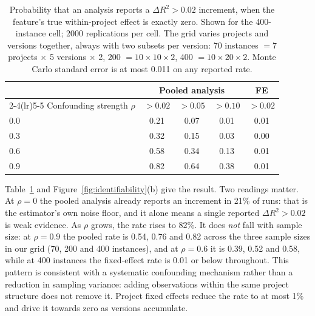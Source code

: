 \documentclass[preprint,12pt]{elsarticle}
\begin{document}
\begin{table}[t]
\centering
\caption{Probability that an analysis reports a $\Delta R^2 > 0.02$
increment, when the feature's true within-project effect is exactly zero.
Shown for the 400-instance cell; \num{2000} replications per cell. The grid
varies projects and versions together, always with two subsets per version:
70 instances $= 7$ projects $\times$ 5 versions $\times$ 2, 200 $= 10 \times
10 \times 2$, 400 $= 10 \times 20 \times 2$. Monte Carlo standard error is
at most \num{0.011} on any reported rate.}
\label{tab:sim}
\begin{tabular}{lcccc}
\toprule
& \multicolumn{3}{c}{Pooled analysis} & FE \\
\cmidrule(lr){2-4}\cmidrule(lr){5-5}
Confounding strength $\rho$ & $>0.02$ & $>0.05$ & $>0.10$ & $>0.02$ \\
\midrule
0.0 & 0.21 & 0.07 & 0.01 & 0.01 \\
0.3 & 0.32 & 0.15 & 0.03 & 0.00 \\
0.6 & 0.58 & 0.34 & 0.13 & 0.01 \\
0.9 & 0.82 & 0.64 & 0.38 & 0.01 \\
\bottomrule
\end{tabular}
\end{table}

Table~\ref{tab:sim} and Figure~\ref{fig:identifiability}(b) give the
result. Two readings matter. At $\rho = 0$ the pooled analysis already
reports an increment in 21\% of runs: that is the estimator's own noise
floor, and it alone means a single reported $\Delta R^2 > 0.02$ is weak
evidence. As $\rho$ grows, the rate rises to 82\%. It does \emph{not} fall with
sample size: at $\rho = 0.9$ the pooled rate is 0.54, 0.76 and 0.82 across
the three sample sizes in our grid (70, 200 and 400 instances), and at
$\rho = 0.6$ it is 0.39, 0.52 and 0.58, while at 400 instances the
fixed-effect rate is 0.01 or below throughout. This pattern is consistent
with a systematic confounding mechanism rather than a reduction in sampling
variance: adding observations within the same project
structure does not remove it. Project fixed effects reduce the rate to at most 1\% and drive it
towards zero as versions accumulate.
\end{document}
